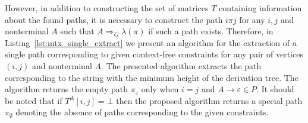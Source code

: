 However, in addition to constructing the set of matrices $T$ containing information about the found paths, it is necessary to construct the path $i \pi j$ for any $i, j$ and nonterminal $A$ such that $A \Rightarrow_G \lambda(\pi)$ if such a path exists. Therefore, in Listing~\ref{lst:mtx_single_extract} we present an algorithm for the extraction of a single path corresponding to given context-free constraints for any pair of vertices $(i, j)$ and nonterminal $A$. The presented algorithm extracts the path corresponding to the string with the minimum height of the derivation tree. The algorithm returns the empty path $\pi_{\varepsilon}$ only when $i = j$ and $A \to \varepsilon \in P$. It should be noted that if $T^A[i, j] = \bot$ then the proposed algorithm returns a special path $\pi_{\emptyset}$ denoting the absence of paths corresponding to the given constraints.

